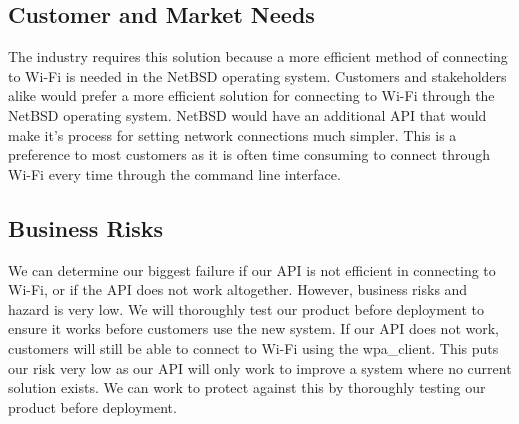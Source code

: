 \subsection{Customer and Market Needs}

The industry requires this solution because a more efficient method of connecting to Wi-Fi is needed in the NetBSD operating system. Customers and 
stakeholders alike would prefer a more efficient solution for connecting to Wi-Fi through the NetBSD operating system. NetBSD would have an additional 
API that would make it’s process for setting network connections much simpler. This is a preference to most customers as it is often time consuming to 
connect through Wi-Fi every time through the command line interface. 

\subsection{Business Risks}

We can determine our biggest failure if our API is not efficient in connecting to Wi-Fi, or if the API does not work altogether. However, business risks 
and hazard is very low. We will thoroughly test our product before deployment to ensure it works before customers use the new system. If our API does not work, 
customers will still be able to connect to Wi-Fi using the wpa_client. This puts our risk very low as our API will only work to improve a system where no current 
solution exists. We can work to protect against this by thoroughly testing our product before deployment. 

